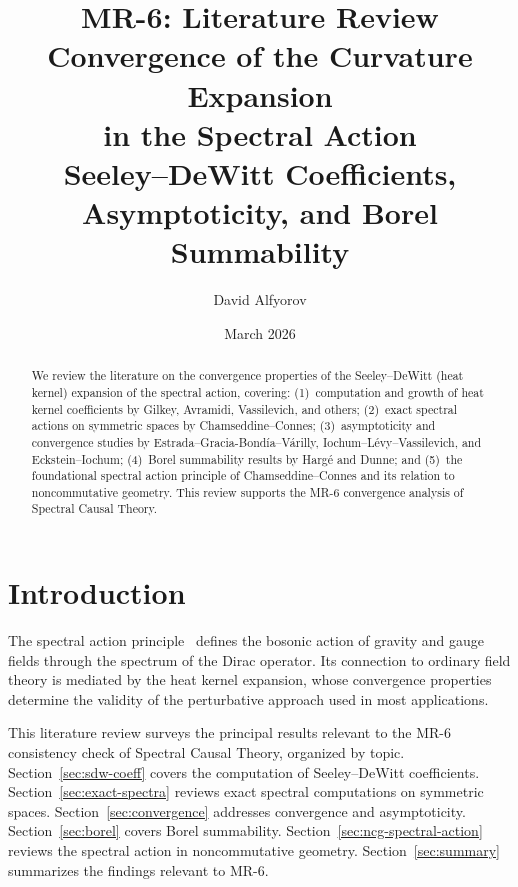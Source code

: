 \documentclass[11pt,a4paper]{article}
\title{MR-6: Literature Review\\
Convergence of the Curvature Expansion\\
in the Spectral Action\\[6pt]
\large Seeley--DeWitt Coefficients, Asymptoticity, and Borel Summability}
\author{David Alfyorov}
\date{March 2026}
\begin{document}
\maketitle

\begin{center}
\end{center}

\begin{abstract}
We review the literature on the convergence properties of the Seeley--DeWitt
(heat kernel) expansion of the spectral action, covering: (1)~computation and
growth of heat kernel coefficients by Gilkey, Avramidi, Vassilevich, and
others; (2)~exact spectral actions on symmetric spaces by Chamseddine--Connes;
(3)~asymptoticity and convergence studies by Estrada--Gracia-Bond\'{i}a--V\'{a}rilly,
Iochum--L\'{e}vy--Vassilevich, and Eckstein--Iochum; (4)~Borel summability
results by Harg\'{e} and Dunne; and (5)~the foundational spectral action
principle of Chamseddine--Connes and its relation to noncommutative geometry.
This review supports the MR-6 convergence analysis of Spectral Causal Theory.
\end{abstract}

\tableofcontents
\newpage


\section{Introduction}\label{sec:intro}

The spectral action principle~\cite{CC96} defines the bosonic action of
gravity and gauge fields through the spectrum of the Dirac operator.
Its connection to ordinary field theory is mediated by the heat kernel
expansion, whose convergence properties determine the validity of the
perturbative approach used in most applications.

This literature review surveys the principal results relevant to the
MR-6 consistency check of Spectral Causal Theory, organized by topic.
Section~\ref{sec:sdw-coeff} covers the computation of Seeley--DeWitt
coefficients.  Section~\ref{sec:exact-spectra} reviews exact spectral
computations on symmetric spaces.  Section~\ref{sec:convergence} addresses
convergence and asymptoticity.  Section~\ref{sec:borel} covers Borel
summability.  Section~\ref{sec:ncg-spectral-action} reviews the spectral
action in noncommutative geometry.  Section~\ref{sec:summary} summarizes
the findings relevant to MR-6.
\end{document}
